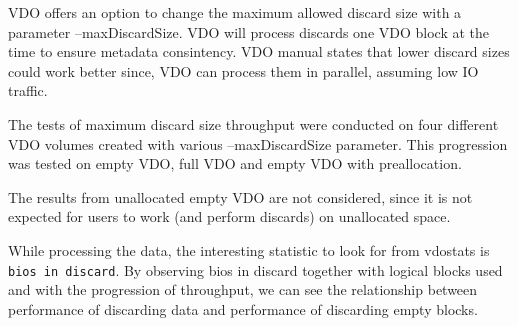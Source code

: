 \documentclass[
  color, %
  table, %
  lof,   %
  lot,   %
]{fithesis3}
\begin{document}
VDO offers an option to change the maximum allowed discard size with a parameter --maxDiscardSize. VDO will process discards one VDO block at the time to ensure metadata consintency. VDO manual states that lower discard sizes could work better since, VDO can process them in parallel, assuming low IO traffic.

The tests of maximum discard size throughput were conducted on four different VDO volumes created with various --maxDiscardSize parameter. This progression was tested on empty VDO, full VDO and empty VDO with preallocation.

The results from unallocated empty VDO are not considered, since it is not expected for users to work (and perform discards) on unallocated space.

While processing the data, the interesting statistic to look for from vdostats is \texttt{bios in discard}. By observing bios in discard together with logical blocks used and with the progression of throughput, we can see the relationship between performance of discarding data and performance of discarding empty blocks.
\end{document}
